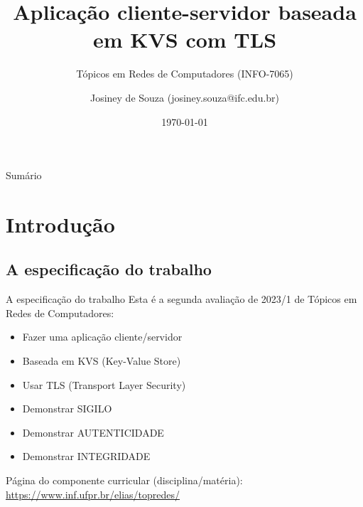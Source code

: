 \documentclass[xcolor=dvipsnames,table]{beamer}
\title{Aplicação cliente-servidor baseada em KVS com TLS}
\subtitle{Tópicos em Redes de Computadores (INFO-7065)}
\author{Josiney de Souza (josiney.souza@ifc.edu.br)}
\institute{UFPR / DInf}
\date{\today}
\begin{document}

\begin{frame}[plain]{}
    \maketitle
\end{frame}

{\small
\begin{frame}[plain]{Sumário}
    \tableofcontents
\end{frame}
}

\section{Introdução}
\subsection{A especificação do trabalho}
\begin{frame}{A especificação do trabalho}
	Esta é a segunda avaliação de 2023/1 de Tópicos em Redes de Computadores:
	\begin{itemize}
		\item Fazer uma aplicação cliente/servidor
		\item Baseada em KVS (Key-Value Store)
		\item Usar TLS (Transport Layer Security)
		\item Demonstrar SIGILO
		\item Demonstrar AUTENTICIDADE
		\item Demonstrar INTEGRIDADE
	\end{itemize}
	Página do componente curricular (disciplina/matéria): \url{https://www.inf.ufpr.br/elias/topredes/}
\end{frame}
\end{document}
